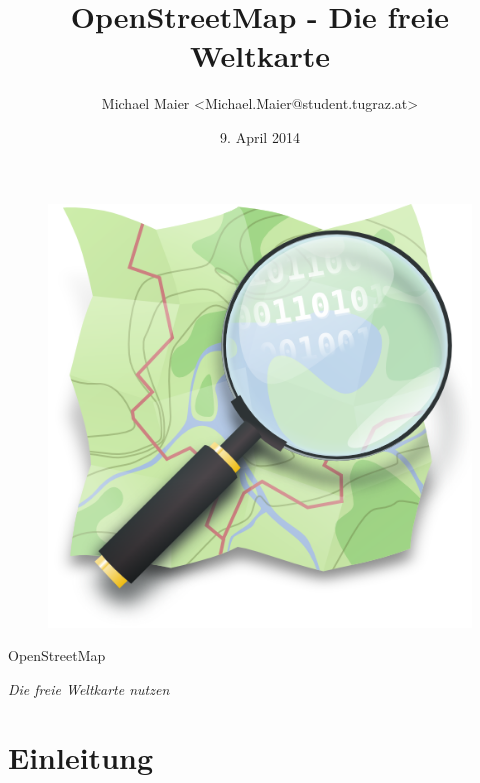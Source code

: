 \documentclass{beamer}
\title{OpenStreetMap - Die freie Weltkarte}
\author{Michael Maier \textless Michael.Maier@student.tugraz.at\textgreater}
\date{9. April 2014}
\begin{document}

\begin{frame} 


\begin{figure}
  \centering
  \includegraphics[width=.5\textwidth]{mag_map.png}
\end{figure}

\begin{center}
\Huge{OpenStreetMap\\}
\end{center}

\begin{center}
\Large{\emph{Die freie Weltkarte nutzen}}
\end{center}

\end{frame}


\section{Einleitung}
\end{document}
